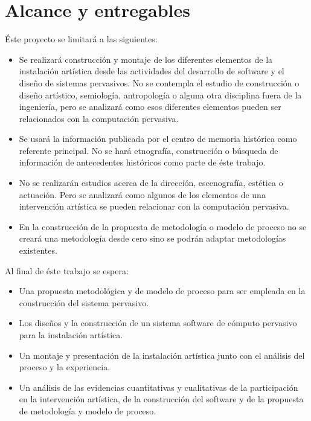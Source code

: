 \section{Alcance y entregables}
\label{alcance}
Éste proyecto se limitará a las siguientes:

\begin{itemize}
    \item Se realizará construcción y montaje de los diferentes elementos de la instalación artística desde las actividades del desarrollo de software y el diseño de sistemas pervasivos. No se contempla el estudio de construcción o diseño artístico, semiología, antropología o alguna otra disciplina fuera de la ingeniería, pero se analizará como esos diferentes elementos pueden ser relacionados con la computación pervasiva.
    \item Se usará la información publicada por el centro de memoria histórica como referente principal. No se hará etnografía, construcción o búsqueda de información de antecedentes históricos como parte de éste trabajo.
    \item No se realizarán estudios acerca de la dirección, escenografía, estética o actuación. Pero se analizará como algunos de los elementos de una intervención artística se pueden relacionar con la computación pervasiva.
    \item En la construcción de la propuesta de metodología o modelo de proceso no se creará una metodología desde cero sino se podrán adaptar metodologías existentes.
\end{itemize}

Al final de éste trabajo se espera:

\begin{itemize}
\item Una propuesta metodológica y de modelo de proceso para ser empleada en la construcción del sistema pervasivo.
\item Los diseños y la construcción de un sistema software de cómputo pervasivo para la instalación artística.
\item Un montaje y presentación de la instalación artística junto con el análisis del proceso y la experiencia.
\item Un análisis de las evidencias cuantitativas y cualitativas de la participación en la intervención artística, de la construcción del software y de la propuesta de metodología y modelo de proceso.

\end{itemize}

